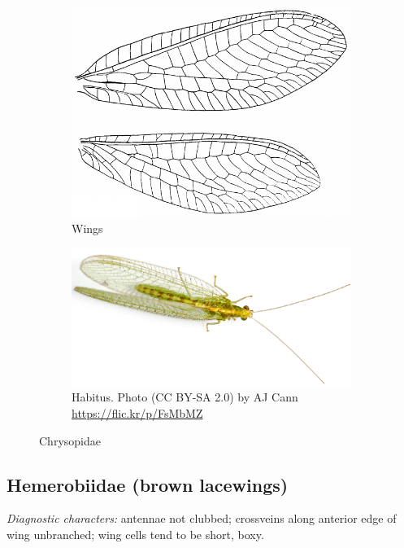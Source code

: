\documentclass[letterpaper, 11pt]{article}
\begin{document}
\begin{figure}[ht!]
    \centering
    \begin{subfigure}[ht!]{0.38\textwidth}
        \includegraphics[width=\textwidth]{ChrysopidWing}
        \caption{Wings \citep[][Fig. 186]{comstock1918wings}}
        \label{fig:chrysopid1}
    \end{subfigure}
    \qquad
    \begin{subfigure}[ht!]{0.5\textwidth}
        \includegraphics[width=\textwidth]{ChrysopidHabitus}
        \caption{Habitus. Photo (CC BY-SA 2.0) by AJ Cann \url{https://flic.kr/p/FsMbMZ}}
        \label{fig:chrysopid2}
    \end{subfigure}
    \caption{Chrysopidae}\label{fig:chrysopids}
\end{figure}

\subsection{Hemerobiidae (brown lacewings)}
\noindent{}\textit{Diagnostic characters:} antennae not clubbed; crossveins along anterior edge of wing unbranched; wing cells tend to be short, boxy.\\
\end{document}
